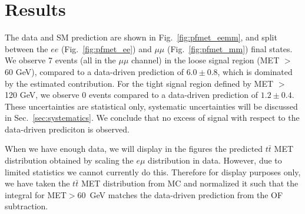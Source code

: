
\section{Results}
\label{sec:results}

The data and SM prediction are shown in Fig.~\ref{fig:pfmet_eemm}, and split between the $ee$ (Fig.~\ref{fig:pfmet_ee})
and $\mu\mu$ (Fig.~\ref{fig:pfmet_mm}) final states. We observe 7  events (all in the $\mu\mu$ channel) in the loose signal 
region (MET $>$ 60 GeV), compared to a data-driven prediction of $6.0 \pm 0.8$, which is dominated by the estimated 
\ttbar contribution. For the tight signal region defined by MET $>$ 120 GeV, we observe 0 events compared to a 
data-driven prediction of $1.2 \pm 0.4$. These uncertainties are statistical only, systematic uncertainties will be 
discussed in Sec.~\ref{sec:systematics}. We conclude that no excess of signal with respect to the data-driven prediciton is observed.

When we have enough data, we will display in the figures the predicted $t\bar{t}$ MET distribution obtained by scaling the $e\mu$ distribution
in data. However, due to limited statistics we cannot currently do this. Therefore for display purposes only, we have taken the
$t\bar{t}$ MET distribution from MC and normalized it such that the integral for MET$>60$~GeV matches the data-driven prediction
from the OF subtraction. 




